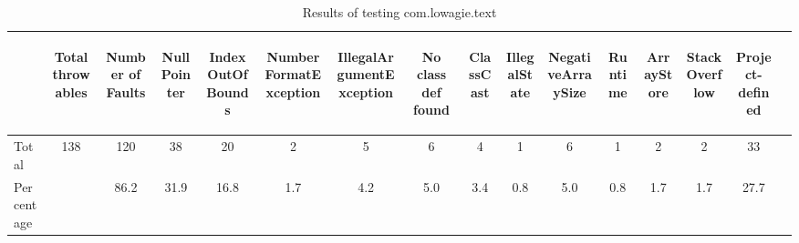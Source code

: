 \begin{table*}[ht!]
\caption{Results of testing com.lowagie.text}\label{tab:comlowagietext}
\begin{minipage}{\textwidth}
{\small
\begin{center}
\begin{tabular}{l c c c c c c c c c c c c c c c}
\hline
&\begin{sideways}Total throwables\end{sideways}&\begin{sideways}Number of Faults\end{sideways}&\begin{sideways}NullPointer\end{sideways}&\begin{sideways}IndexOutOfBounds\end{sideways}&\begin{sideways}NumberFormatException\end{sideways}&\begin{sideways}IllegalArgumentException\end{sideways}&\begin{sideways}No class def found\end{sideways}&\begin{sideways}ClassCast\end{sideways}&\begin{sideways}IllegalState\end{sideways}&\begin{sideways}NegativeArraySize\end{sideways}&\begin{sideways}Runtime\end{sideways}&\begin{sideways}ArrayStore\end{sideways}&\begin{sideways}StackOverflow\end{sideways}&\begin{sideways}Project-defined\end{sideways}\\
\hline
Total&138&120&38&20&2&5&6&4&1&6&1&2&2&33\\
\hline
Percentage&&86.2&31.9&16.8&1.7&4.2&5.0&3.4&0.8&5.0&0.8&1.7&1.7&27.7\\
\hline
\end{tabular}
\end{center}
}
\end{minipage}
\end{table*}

